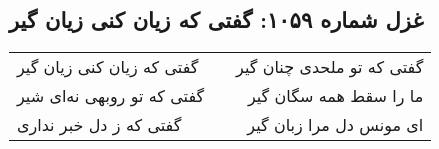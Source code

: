 \begin{center}
\section*{غزل شماره ۱۰۵۹: گفتی که زیان کنی زیان گیر}
\label{sec:1059}
\begin{longtable}{l p{0.5cm} r}
گفتی که زیان کنی زیان گیر
&&
گفتی که تو ملحدی چنان گیر
\\
گفتی که تو روبهی نه‌ای شیر
&&
ما را سقط همه سگان گیر
\\
گفتی که ز دل خبر نداری
&&
ای مونس دل مرا زبان گیر
\\
\end{longtable}
\end{center}
